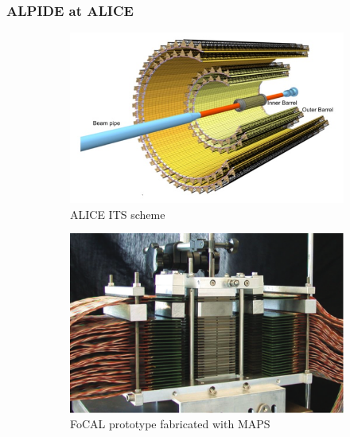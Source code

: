         \subsubsection{ALPIDE at ALICE}
        \begin{figure}
            \centering
            \begin{subfigure}[b]{0.6\textwidth}
                \centering
                \includegraphics[width=\linewidth]{figures/pixel_detectors_usage/alice.png}        
                \caption{ALICE ITS scheme}
                \label{fig:ALICE_ITS}
            \end{subfigure}
            \hfill
            \begin{subfigure}[b]{0.39\textwidth}
                \centering
                \includegraphics[width=\linewidth]{figures/pixel_detectors_usage/ALICE_FoCAL.png}
                \caption{FoCAL prototype fabricated with MAPS}
                \label{fig:ALICE_FoCAL}
            \end{subfigure}
            \caption{}
            \label{fig:ALICE_RD}
       \end{figure}
        
